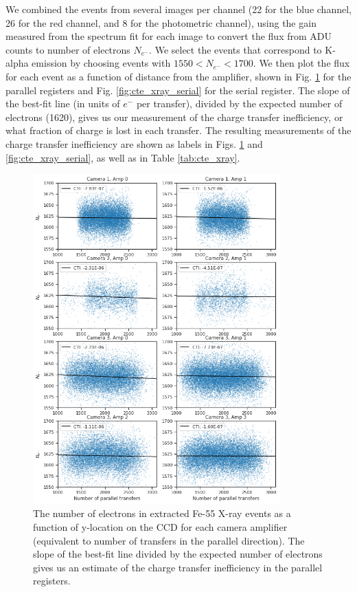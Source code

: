 We combined the events from several images per channel (22 for the blue channel, 26 for the red channel, and 8 for the photometric channel), using the gain measured from the spectrum fit for each image to convert the flux from ADU counts to number of electrons $N_{e^-}$. We select the events that correspond to K-alpha emission by choosing events with $1550 < N_{e^-} < 1700$. We then plot the flux for each event as a function of distance from the amplifier, shown in Fig. \ref{fig:cte_xray} for the parallel registers and Fig. \ref{fig:cte_xray_serial} for the serial register. The slope of the best-fit line (in units of $e^-$ per transfer), divided by the expected number of electrons (1620), gives us our measurement of the charge transfer inefficiency, or what fraction of charge is lost in each transfer. The resulting measurements of the charge transfer inefficiency are shown as labels in Figs. \ref{fig:cte_xray} and \ref{fig:cte_xray_serial}, as well as in Table \ref{tab:cte_xray}.

\begin{figure}[htbp]
    \centering
    \includegraphics[width=0.85\textwidth]{figures/cte/xray_cte_parallel.png}
    \caption{The number of electrons in extracted Fe-55 X-ray events as a function of y-location on the CCD for each camera amplifier (equivalent to number of transfers in the parallel direction). The slope of the best-fit line divided by the expected number of electrons gives us an estimate of the charge transfer inefficiency in the parallel registers.}
    \label{fig:cte_xray}
\end{figure}

